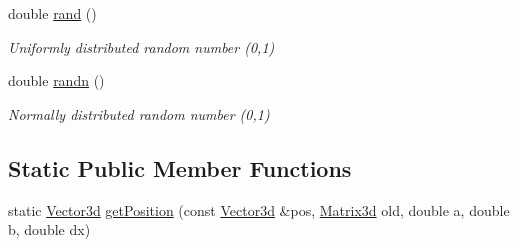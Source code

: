 \begin{DoxyCompactItemize}
\mbox{\label{classCPlantBox_1_1TropismFunction_ada922028b5c7d409e3156124b0bd3709}} 
double \hyperlink{classCPlantBox_1_1TropismFunction_ada922028b5c7d409e3156124b0bd3709}{rand} ()
\begin{DoxyCompactList}\small\item\em Uniformly distributed random number (0,1) \end{DoxyCompactList}\item 
\mbox{\label{classCPlantBox_1_1TropismFunction_a6650427428f7c21bcdb92437c8de7598}} 
double \hyperlink{classCPlantBox_1_1TropismFunction_a6650427428f7c21bcdb92437c8de7598}{randn} ()
\begin{DoxyCompactList}\small\item\em Normally distributed random number (0,1) \end{DoxyCompactList}\end{DoxyCompactItemize}
\subsection*{Static Public Member Functions}
\begin{DoxyCompactItemize}
\item 
static \hyperlink{classCPlantBox_1_1Vector3d}{Vector3d} \hyperlink{classCPlantBox_1_1TropismFunction_a13c5991a183f9dbb6c9dc7f85aec5cd6}{get\+Position} (const \hyperlink{classCPlantBox_1_1Vector3d}{Vector3d} \&pos, \hyperlink{classCPlantBox_1_1Matrix3d}{Matrix3d} old, double a, double b, double dx)
\end{DoxyCompactItemize}
